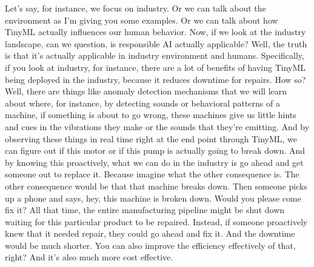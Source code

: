 Let's say, for instance, we focus on industry.
Or we can talk about the environment as I'm giving you some examples.
Or we can talk about how TinyML actually influences our human behavior.
Now, if we look at the industry landscape, can we question, is responsible AI actually applicable?
Well, the truth is that it's actually applicable in industry environment and humans.
Specifically, if you look at industry, for instance, there are a lot of benefits of having TinyML being deployed in the industry, because it reduces downtime for repairs.
How so?
Well, there are things like anomaly detection mechanisms that we will learn about where, for instance, by detecting sounds or behavioral patterns of a machine, if something is about to go wrong, these machines give us little hints and cues in the vibrations they make or the sounds that they're emitting.
And by observing these things in real time right at the end point through TinyML, we can figure out if this motor or if this pump is actually going to break down.
And by knowing this proactively, what we can do in the industry is go ahead and get someone out to replace it.
Because imagine what the other consequence is.
The other consequence would be that that machine breaks down.
Then someone picks up a phone and says, hey, this machine is broken down.
Would you please come fix it?
All that time, the entire manufacturing pipeline might be shut down waiting for this particular product to be repaired.
Instead, if someone proactively knew that it needed repair, they could go ahead and fix it.
And the downtime would be much shorter.
You can also improve the efficiency effectively of that, right?
And it's also much more cost effective.


